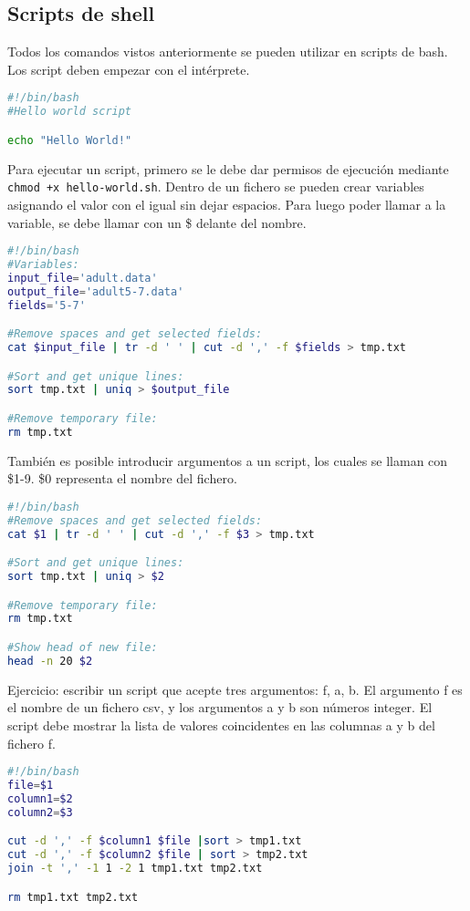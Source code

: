 \subsection{Scripts de shell}
Todos los comandos vistos anteriormente se pueden utilizar en scripts de bash. Los script deben empezar con el intérprete.
\begin{lstlisting}[language=bash]
#!/bin/bash
#Hello world script

echo "Hello World!"
\end{lstlisting}

Para ejecutar un script, primero se le debe dar permisos de ejecución mediante \texttt{chmod +x hello-world.sh}. Dentro de un fichero se pueden crear variables asignando el valor con el igual sin dejar espacios. Para luego poder llamar a la variable, se debe llamar con un \$ delante del nombre.

\begin{lstlisting}[language=bash]
#!/bin/bash
#Variables:
input_file='adult.data'
output_file='adult5-7.data'
fields='5-7'

#Remove spaces and get selected fields:
cat $input_file | tr -d ' ' | cut -d ',' -f $fields > tmp.txt

#Sort and get unique lines:
sort tmp.txt | uniq > $output_file

#Remove temporary file:
rm tmp.txt
\end{lstlisting}

También es posible introducir argumentos a un script, los cuales se llaman con \$1-9. \$0 representa el nombre del fichero.
\begin{lstlisting}[language=bash]
#!/bin/bash
#Remove spaces and get selected fields:
cat $1 | tr -d ' ' | cut -d ',' -f $3 > tmp.txt

#Sort and get unique lines:
sort tmp.txt | uniq > $2

#Remove temporary file:
rm tmp.txt

#Show head of new file:
head -n 20 $2
\end{lstlisting}

Ejercicio: escribir un script que acepte tres argumentos: f, a, b. El argumento f es el nombre de un fichero csv, y los argumentos a y b son números integer. El script debe mostrar la lista de valores coincidentes en las columnas a y b del fichero f.
\begin{lstlisting}[language=bash]
#!/bin/bash
file=$1
column1=$2
column2=$3

cut -d ',' -f $column1 $file |sort > tmp1.txt
cut -d ',' -f $column2 $file | sort > tmp2.txt
join -t ',' -1 1 -2 1 tmp1.txt tmp2.txt

rm tmp1.txt tmp2.txt
\end{lstlisting}

